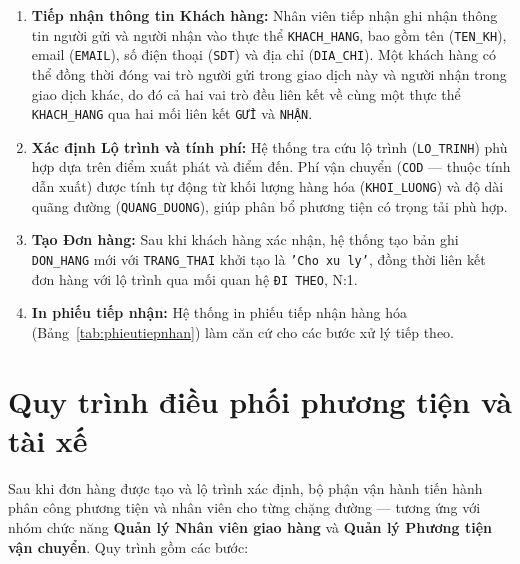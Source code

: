 \documentclass[11pt]{report}
\begin{document}
\begin{enumerate}
    \item \textbf{Tiếp nhận thông tin Khách hàng:} Nhân viên tiếp nhận ghi nhận thông tin người gửi và người nhận vào thực thể \texttt{KHACH\_HANG}, bao gồm tên (\texttt{TEN\_KH}), email (\texttt{EMAIL}), số điện thoại (\texttt{SDT}) và địa chỉ (\texttt{DIA\_CHI}). Một khách hàng có thể đồng thời đóng vai trò người gửi trong giao dịch này và người nhận trong giao dịch khác, do đó cả hai vai trò đều liên kết về cùng một thực thể \texttt{KHACH\_HANG} qua hai mối liên kết \texttt{GỬI} và \texttt{NHẬN}.
    
    \item \textbf{Xác định Lộ trình và tính phí:} Hệ thống tra cứu lộ trình (\texttt{LO\_TRINH}) phù hợp dựa trên điểm xuất phát và điểm đến. Phí vận chuyển (\texttt{COD} --- thuộc tính dẫn xuất) được tính tự động từ khối lượng hàng hóa (\texttt{KHOI\_LUONG}) và độ dài quãng đường (\texttt{QUANG\_DUONG}), giúp phân bổ phương tiện có trọng tải phù hợp.
    
    \item \textbf{Tạo Đơn hàng:} Sau khi khách hàng xác nhận, hệ thống tạo bản ghi \texttt{DON\_HANG} mới với \texttt{TRANG\_THAI} khởi tạo là \texttt{'Cho xu ly'}, đồng thời liên kết đơn hàng với lộ trình qua mối quan hệ \texttt{ĐI THEO}, N:1.
    
    \item \textbf{In phiếu tiếp nhận:} Hệ thống in phiếu tiếp nhận hàng hóa (Bảng~\ref{tab:phieutiepnhan}) làm căn cứ cho các bước xử lý tiếp theo.
\end{enumerate}


\section{Quy trình điều phối phương tiện và tài xế}
\label{sec:qt_dieuphoI}

Sau khi đơn hàng được tạo và lộ trình xác định, bộ phận vận hành tiến hành phân công phương tiện và nhân viên cho từng chặng đường --- tương ứng với nhóm chức năng \textbf{Quản lý Nhân viên giao hàng} và \textbf{Quản lý Phương tiện vận chuyển}. Quy trình gồm các bước:
\end{document}
